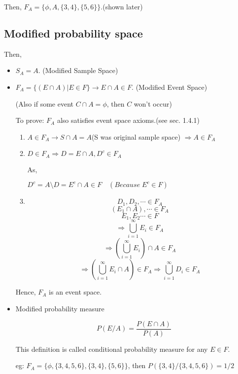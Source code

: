 \documentclass{article}
\begin{document}
Then, $ F_A= \{ \phi, A, \{3,4\},\{5,6\} \} $.(shown later)


\subsection{Modified probability space}

Then,
\begin{itemize}
    \item $S_A = A$. (Modified Sample Space)

    \item $F_A = \{ (E \cap A) | E \in F \} \rightarrow E \cap A \in F$. (Modified Event Space)

    (Also if some event $C \cap A = \phi $, then $C$ won't occur)



    To prove: $F_A$ also satisfies event space axioms.(see sec. 1.4.1)

    \begin{enumerate}
        \item $A \in F_A \rightarrow S\cap A = A$(S was original sample space)
        $\Rightarrow A \in F_A$

        \item $D \in F_A \Rightarrow D = E \cap A, D^c \in F_A$

        As,

        $D^c = A \setminus D= E^c \cap A \in F \quad(Because\;  E^c \in F)$

        \item $$D_1,D_2,\cdots \in F_A$$
        $$ (E_1 \cap A), \cdots \in F_A$$
        $$ E_1, E_2 \cdots \in F$$
        $$  \Rightarrow \bigcup_{i=1}^{\infty} E_i \in F_A$$
        $$ \Rightarrow  (\bigcup_{i=1}^{\infty} E_i) \cap A \in F_A$$
        $$\Rightarrow  (\bigcup_{i=1}^{\infty} E_i \cap A) \in F_A \Rightarrow  \bigcup_{i=1}^{\infty} D_i \in F_A$$

    \end{enumerate}
    Hence, $F_A$ is an event space.

    \item Modified probability measure

    $$ P(E/A)= \frac{P(E \cap A)}{P(A)}$$

    This definition is called conditional probability measure for any $E \in F$.

    eg:
    $ F_A = \{ \phi, \{3,4,5,6\}, \{ 3,4\}, \{5,6\} \}$, then $P(\{ 3,4\} / \{3,4,5,6\})=1/2$


\end{itemize}
\end{document}
